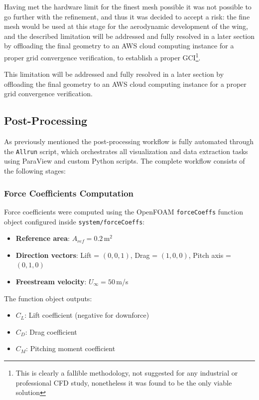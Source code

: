 \documentclass[12pt,a4paper]{article}
\begin{document}
Having met the hardware limit for the finest mesh possible it was not possible to go further with the refinement, and thus it was decided to accept a risk: the fine mesh would be used at this stage for the aerodynamic development of the wing, and the described limitation will be addressed and fully resolved in a later section by offloading the final geometry to an AWS cloud computing instance for a proper grid convergence verification, to establish a proper GCI\footnote{This is clearly a fallible methodology, not suggested for any industrial or professional CFD study, nonetheless it was found to be the only viable solution}.

This limitation will be addressed and fully resolved in a later section by offloading the final geometry to an AWS cloud computing instance for a proper grid convergence verification.

\subsection{Post-Processing}

As previously mentioned the post-processing workflow is fully automated through the \texttt{Allrun} script, which orchestrates all visualization and data extraction tasks using ParaView and custom Python scripts. The complete workflow consists of the following stages:

\subsubsection{Force Coefficients Computation}

Force coefficients were computed using the OpenFOAM \texttt{forceCoeffs} function object configured inside \texttt{system/forceCoeffs}:

\begin{itemize}
    \item \textbf{Reference area}: $A_{ref} = 0.2$\,m$^2$
    \item \textbf{Direction vectors}: Lift = $(0,0,1)$, Drag = $(1,0,0)$, Pitch axis = $(0,1,0)$
    \item \textbf{Freestream velocity}: $U_{\infty} = 50$\,m/s
\end{itemize}

The function object outputs:

\begin{itemize}
    \item $C_L$: Lift coefficient (negative for downforce)
    \item $C_D$: Drag coefficient
    \item $C_M$: Pitching moment coefficient
\end{itemize}
\end{document}

